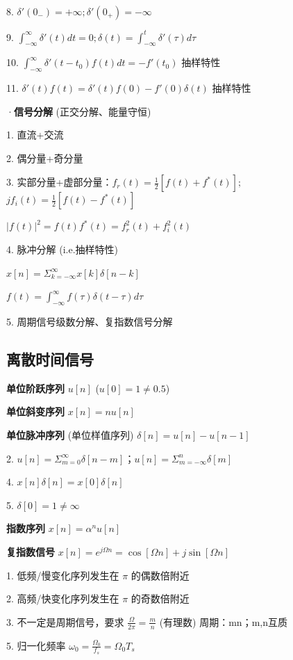    8. $\delta'(0_-) = + \infty ; \delta'(0_+) = - \infty$
   
   9. $\int ^{\infty} _{-\infty} \delta' (t)dt = 0; \delta(t)=\int ^t _{-\infty} \delta'(\tau)d\tau$
   
   10. $\int ^{\infty} _{-\infty} \delta' (t-t_0)f(t)dt = -f'(t_0)$ 抽样特性
   
   11. $\delta '(t)f(t) = \delta'(t)f(0) - f'(0)\delta(t)$ 抽样特性
   
·\textbf{信号分解} (正交分解、能量守恒)

1. 直流+交流

2. 偶分量+奇分量

3. 实部分量+虚部分量：$f_r(t)=\frac{1}{2}[f(t)+f^*(t)];$   $jf_i(t)=\frac{1}{2}[f(t)-f^*(t)]$
   
   $|f(t)|^2 = f(t)f^*(t)=f_r^2(t)+f_i^2(t)$

4. 脉冲分解 (i.e.抽样特性)
   
   $x[n] = \Sigma ^{\infty} _{k=- \infty} x[k]\delta[n-k]$
   
   $f(t) = \int ^{\infty} _{-\infty} f(\tau)\delta(t-\tau)d\tau$

5. 周期信号级数分解、复指数信号分解

\subsection*{离散时间信号}

\textbf{单位阶跃序列} $u[n]$ ($u[0] = 1 \ne 0.5$)

\textbf{单位斜变序列} $x[n]=nu[n]$

\textbf{单位脉冲序列} (单位样值序列) $\delta[n] = u[n] - u[n-1]$
      
   2. $u[n]=\Sigma ^{\infty} _{m=0} \delta[n-m]$；$u[n]=\Sigma ^{n} _{m=-\infty} \delta[m]$
   
   4. $x[n]\delta[n]=x[0]\delta[n]$
   
   5. $\delta[0]=1 \ne \infty$

\textbf{指数序列} $x[n] = \alpha^n u[n]$

\textbf{复指数信号} $x[n]=e^{j\Omega n} = \cos[\Omega n] + j\sin[\Omega n]$
   
   1. 低频/慢变化序列发生在 $\pi$ 的偶数倍附近
   
   2. 高频/快变化序列发生在 $\pi$ 的奇数倍附近
   
   3. 不一定是周期信号，要求 $\frac{\Omega}{2\pi}= \frac{m}{n}$ (有理数) 周期：mn；m,n互质
      
   5. 归一化频率 $\omega _0 = \frac{\Omega _0}{f_s} = \Omega _0 T_s$

